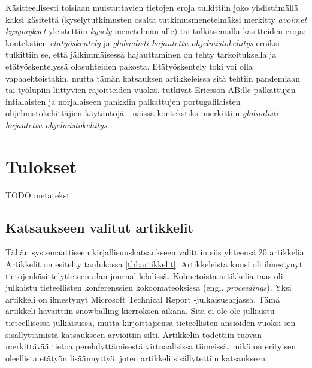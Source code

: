 \documentclass[utf8]{gradu3}
\begin{document}
Käsitteellisesti toisiaan muistuttavien tietojen eroja tulkittiin joko yhdistämällä kaksi käsitettä (kyselytutkimusten osalta tutkimusmenetelmäksi merkitty \textit{avoimet kysymykset} yleistettiin \textit{kysely}-menetelmän alle) tai tulkitsemalla käsitteiden eroja: kontekstien \textit{etätyöskentely} ja \textit{globaalisti hajautettu ohjelmistokehitys} eroiksi tulkittiin se, että jälkimmäisessä hajauttaminen on tehty tarkoituksella ja etätyöskentelyssä olosuhteiden pakosta. Etätyöskentely toki voi olla vapaaehtoistakin, mutta tämän katsauksen artikkeleissa sitä tehtiin pandemiaan \parencite{rodeghero-ym-2021} tai työlupiin \parencite{hemphill-begel-2011} liittyvien rajoitteiden vuoksi. \textcite{britto-ym-2020} tutkivat Ericsson AB:lle palkattujen intialaisten ja \textcite{moe-ym-2020} norjalaiseen pankkiin palkattujen portugalilaisten ohjelmistokehittäjien käytäntöjä - näissä kontekstiksi merkittiin \textit{globaalisti hajautettu ohjelmistokehitys}.

\chapter{Tulokset}
\label{paaluku-tulokset}

TODO metateksti

\section{Katsaukseen valitut artikkelit}

Tähän systemaattiseen kirjallisuuskatsaukseen valittiin siis yhteensä 20 artikkelia. Artikkelit on esitelty taulukossa \ref{tbl:artikkelit}. Artikkeleista kuusi oli ilmestynyt tietojenkäsittelytieteen alan journal-lehdissä. Kolmetoista artikkelia taas oli julkaistu tieteellisten konferenssien kokoomateoksissa (engl. \textit{proceedings}). Yksi artikkeli \parencite{hemphill-begel-2011} on ilmestynyt Microsoft Technical Report -julkaisusarjassa. Tämä artikkeli havaittiin snowballing-kierroksen aikana. Sitä ei ole ole julkaistu tieteellisessä julkaisussa, mutta kirjoittajiensa tieteellisten ansioiden vuoksi sen sisällyttämistä katsaukseen arvioitiin silti. Artikkelin todettiin tuovan merkittävää tietoa perehdyttämisestä virtuaalisissa tiimeissä, mikä on erityisen oleellista etätyön lisäännyttyä, joten artikkeli sisällytettiin katsaukseen.
\end{document}
